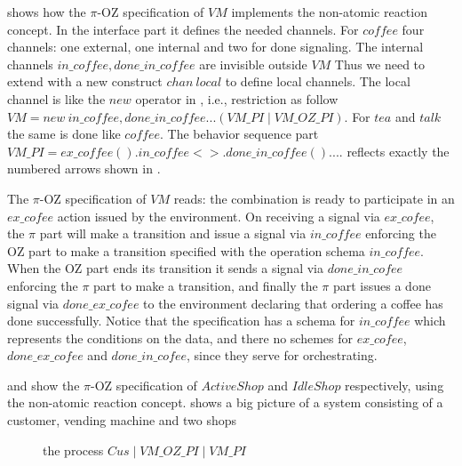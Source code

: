  shows how the $\pi$-OZ specification of $VM$ implements the non-atomic reaction concept. In the interface part it defines the needed channels. For $coffee$ four channels: one external, one internal and two for done signaling. The internal channels $in\_coffee,done\_in\_coffee$ are invisible outside $VM$ Thus we need to extend \oz{} with a new construct $chan\ local$ to define local channels. The local channel is like the $new$ operator in \picalc{}, i.e., restriction as follow $VM = new\ in\_coffee,done\_in\_coffee...(VM\_PI\mid VM\_OZ\_PI)$. For $tea$ and $talk$ the same is done like $coffee$. The behavior sequence part $VM\_PI = ex\_coffee().in\_coffee<>.done\_in\_coffee() .... $ reflects exactly the numbered arrows shown in . 

The $\pi$-OZ specification of $VM$ reads: the combination is ready to participate in an $ex\_cofee$ action issued by the environment. On receiving a signal via $ex\_cofee$, the $\pi$ part will make a transition and issue a signal via $in\_coffee$ enforcing the OZ part to make a transition specified with the operation schema $in\_coffee$. When the OZ part ends its transition it sends a signal via $done\_in\_cofee$ enforcing the $\pi$ part to make a transition, and finally the $\pi$ part issues a done signal via $done\_ex\_cofee$ to the environment declaring that ordering a coffee has done successfully. Notice that the specification has a schema for $in\_coffee$ which represents the conditions on the data, and there no schemes for $ex\_cofee$, $done\_ex\_cofee$ and $done\_in\_cofee$, since they serve for orchestrating.

 and  show the $\pi$-OZ specification of $ActiveShop$ and $IdleShop$ respectively, using the non-atomic reaction concept.  shows a big picture of a system consisting of a customer, vending machine and two shops

\begin{figure}[H]%
\centering
{}%
\caption{the process $Cus \mid VM\_OZ\_PI \mid VM\_PI$}
\label{binary_reactoin}%
\end{figure}

